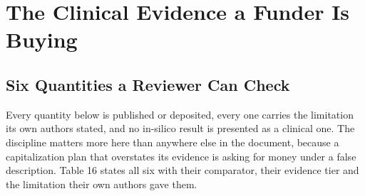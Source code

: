 \section{The Clinical Evidence a Funder Is Buying}

\subsection{Six Quantities a Reviewer Can Check}

Every quantity below is published or deposited, every one carries the limitation
its own authors stated, and no in-silico result is presented as a clinical one.
The discipline matters more here than anywhere else in the document, because a
capitalization plan that overstates its evidence is asking for money under a
false description. Table 16 states all six with their comparator, their evidence
tier and the limitation their own authors gave them.

